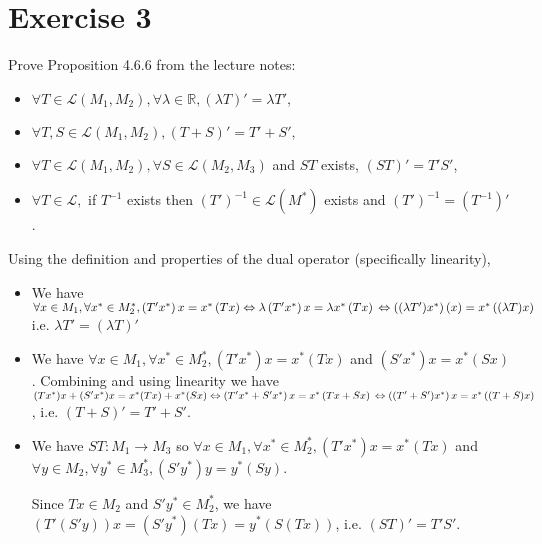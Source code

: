 \documentclass[12pt,a4paper]{article}
\newcommand{\R}{\mathbb{R}}
\theoremstyle{plain}
\theoremstyle{remark}
\theoremstyle{definition}
\begin{document}
\pagebreak
\section*{Exercise 3}
Prove Proposition 4.6.6 from the lecture notes:\\
\begin{itemize}
	\item $\forall T \in \mathscr{L}(M_1,M_2),\forall \lambda\in\R,(\lambda T)' = \lambda T',$
	
	\item $\forall T,S\in\mathscr{L}(M_1,M_2),(T+S)' = T'+S',$
	
	\item $\forall T \in \mathscr{L}(M_1,M_2),\forall S \in \mathscr{L}(M_2,M_3)$ and $ST$ exists, $(ST)' = T'S'$,
	
	\item $\forall T \in \mathscr{L},$ if $T^{-1}$ exists then $(T')^{-1} \in \mathscr{L}(M^{\ast})$ exists and $(T')^{-1} = (T^{-1})'$.
\end{itemize}

Using the definition and properties of the dual operator (specifically linearity),
\begin{itemize}
	
	\item We have $\forall x \in M_1, \forall x^* \in M_2^*, \left(T'x^*\right)x = x^*\left(Tx\right) \Leftrightarrow \lambda \left(T'x^*\right)x = \lambda x^*\left(Tx\right)\\
	 \Leftrightarrow \left((\lambda T')x^*\right)(x) = x^*\left((\lambda T)x\right)$ i.e. $\lambda T' = (\lambda T)'$
	 
	 \item We have $\forall x \in M_1, \forall x^* \in M_2^*, (T'x^*)x = x^*(Tx)$ and $(S'x^*)x = x^*(Sx)$. Combining and using linearity we have\\
	 $(Tx^*)x + (S'x^*)x = x^*(Tx) + x^*(Sx) \Leftrightarrow \left(T'x^* + S'x^*\right)x = x^*\left(Tx + Sx\right)\\
	 \Leftrightarrow \left((T' + S')x^*\right)x = x^*\left((T + S)x\right)$, i.e. $(T + S)' = T' + S'$.
	
	\item We have $ST:M_1 \to M_3$ so $\forall x \in M_1, \forall x^* \in M_2^*, (T'x^*)x = x^*(Tx)$ and $\forall y \in M_2, \forall y^* \in M_3^*, (S'y^*)y = y^*(Sy)$.
	
	Since $Tx \in M_2$ and $S'y^* \in M_2^*$, we have $(T'(S'y))x = (S'y^*)(Tx) = y^*(S(Tx))$, i.e. $(ST)' = T'S'$.
	
	
\end{itemize}
\end{document}
